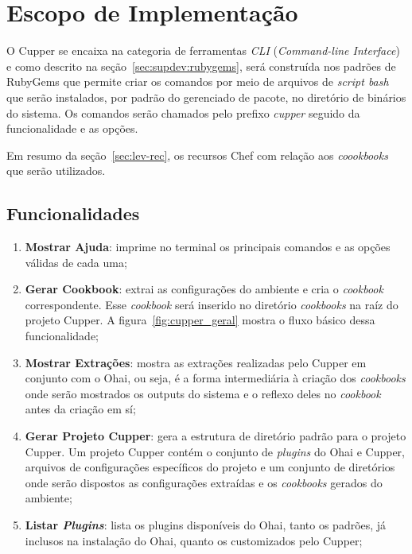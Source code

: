 \section{Escopo de Implementação}
\label{sec:escopo}

O Cupper se encaixa na categoria de ferramentas \textit{CLI} (\textit{Command-line Interface})
e como descrito na seção~\ref{sec:supdev:rubygems}, será construída nos padrões de
RubyGems que permite criar os comandos por meio de arquivos de \textit{script bash}
que serão instalados, por padrão do gerenciado de pacote, no diretório de binários do sistema.
Os comandos serão chamados pelo prefixo \textit{cupper} seguido da funcionalidade e as opções.


Em resumo da seção~\ref{sec:lev-rec}, os recursos Chef com relação aos \textit{coookbooks} que serão utilizados.

\subsection{Funcionalidades}

\begin{enumerate}
  \item \textbf{Mostrar Ajuda}: imprime no terminal os principais comandos e as opções válidas de
    cada uma;

  \item \textbf{Gerar Cookbook}: extrai as configurações do ambiente e cria o \textit{cookbook} correspondente.
    Esse \textit{cookbook} será inserido no diretório \textit{cookbooks} na raíz do projeto Cupper.
    A figura~\ref{fig:cupper_geral} mostra o fluxo básico dessa funcionalidade;

  \item \textbf{Mostrar Extrações}: mostra as extrações realizadas pelo Cupper em conjunto com o Ohai,
    ou seja, é a forma intermediária à criação dos \textit{cookbooks} onde serão mostrados os outputs do
    sistema e o reflexo deles no \textit{cookbook} antes da criação em sí;

  \item \textbf{Gerar Projeto Cupper}: gera a estrutura de diretório padrão para o projeto Cupper.
    Um projeto Cupper contém o conjunto de \textit{plugins} do Ohai e Cupper, arquivos de configurações
    específicos do projeto e um conjunto de diretórios onde serão dispostos as configurações
    extraídas e os \textit{cookbooks} gerados do ambiente;

  \item \textbf{Listar \textit{Plugins}}: lista os plugins disponíveis do Ohai, tanto os padrões, já inclusos
    na instalação do Ohai, quanto os customizados pelo Cupper;

\end{enumerate}

